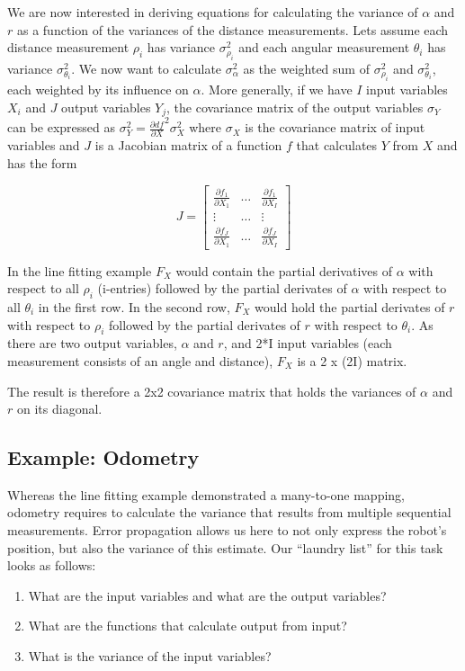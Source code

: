 We are now interested in deriving equations for calculating the variance of $ \alpha$ and $ r$ as a function of the variances of the distance measurements. Lets assume each distance measurement $ \rho_i$ has variance $ \sigma^2_{\rho_i}$ and each angular measurement $ \theta_i$ has variance $ \sigma^2_{\theta_i}$. We now want to calculate $ \sigma^2_{\alpha}$ as the weighted sum of  $ \sigma^2_{\rho_i}$ and $ \sigma^2_{\theta_i}$, each weighted by its influence on $ \alpha$.
More generally, if we have $ I$ input variables $ X_i$ and $ J$ output variables $Y_j$, the covariance matrix of the output variables $ \sigma_Y$ can be expressed as $\sigma_Y^2=\frac{\partial df}{\partial X}^2 \sigma_X^2$ where $\sigma_X$ is the covariance matrix of input variables and $J$ is a Jacobian matrix of a function $ f$ that calculates $Y$ from $X$ and has the form

\begin{equation}
J=\left[
\begin{array}{ccc}
  \frac{\partial f_1}{\partial X_1} & \ldots & \frac{\partial f_1}{\partial X_I}\\
  \vdots & \ldots & \vdots\\
  \frac{\partial f_J}{\partial X_1} & \ldots & \frac{\partial f_J}{\partial X_I}
 \end{array}
 \right]
\end{equation}

In the line fitting example $ F_X$ would contain the partial derivatives of $ \alpha$ with respect to all $ \rho_i$ (i-entries) followed by the partial derivates of $ \alpha$ with respect to all $ \theta_i$ in the first row. In the second row, $ F_X$ would hold the partial derivates of $ r$ with respect to $ \rho_i$ followed by the partial derivates of $ r$ with respect to $ \theta_i$. As there are two output variables, $ \alpha$ and $ r$, and 2*I input variables (each measurement consists of an angle and distance), $ F_X$ is a 2 x (2I) matrix.

The result is therefore a 2x2 covariance matrix that holds the variances of $ \alpha$ and $ r$ on its diagonal.

\subsection{Example: Odometry}
Whereas the line fitting example demonstrated a many-to-one mapping, odometry requires to calculate the variance that results from multiple sequential measurements.  Error propagation allows us here to not only express the robot's position, but also the variance of this estimate. Our ``laundry list'' for this task looks as follows:
\begin{enumerate}
\item What are the input variables and what are the output variables?
\item What are the functions that calculate output from input?
\item What is the variance of the input variables?
\end{enumerate}

